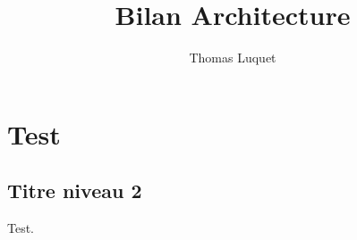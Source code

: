 \documentclass{rtxreport}
\author{Thomas Luquet}
\title{Bilan Architecture}
\begin{document}
\maketitle

\rtxmaketitleblock

\tableofcontents

\chapter{Test}

\section{Titre niveau 2}

Test.
\end{document}
